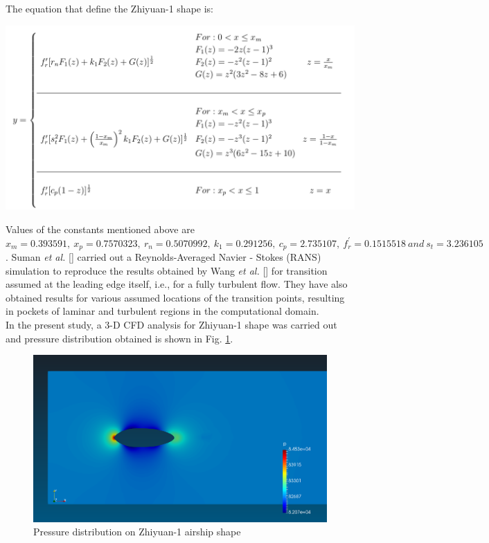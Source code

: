 The equation that define the Zhiyuan-1 shape is:
\begin{center}
	\includegraphics[width= 400 pt]{rnd/zhiyuan_equations.png}
\end{center}
Values of the constants mentioned above are $ x_{m} = 0.393591,\ x_{p} = 0.7570323,\ r_{n} = 0.5070992,\ k_{1} = 0.291256,\ c_{p} = 2.735107,\  f_{r}^{'} = 0.1515518\ and\  s_{t} = 3.236105 $. Suman \textit{et al.} [] carried out a Reynolds-Averaged Navier - Stokes (RANS) simulation to reproduce the results obtained by Wang \textit{et al.} [] for transition assumed at the leading edge itself, i.e., for a fully turbulent flow. They have also obtained results for various assumed locations of the transition points, resulting in pockets of laminar and turbulent regions in the computational domain.\\ In the present study, a 3-D CFD analysis for Zhiyuan-1 shape was carried out and pressure distribution obtained is shown in Fig. \ref {fig:Zhiyuan-1 pressure}. 
\begin{figure}[H]
	\centering
	\includegraphics[width=300 pt]{rnd/pressure_zhiyuan.png}
	\caption{Pressure distribution on Zhiyuan-1 airship shape}
	\label{fig:Zhiyuan-1 pressure} %
\end{figure}

